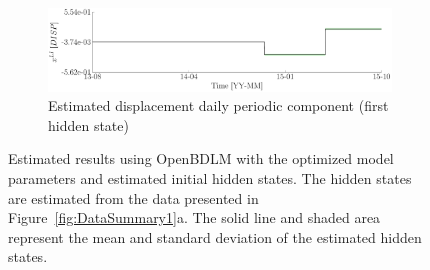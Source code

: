 \begin{figure}[h!]
\begin{center}
\begin{subfigure}{\linewidth}
\centering
\includegraphics[width=0.9\linewidth]{./docfigs/Example_DISP_INTERVENTION/DISP_LI_7.pdf}
\caption{Estimated displacement daily periodic component (first hidden state)}
\end{subfigure}
\caption{Estimated results using OpenBDLM with the optimized model parameters and estimated initial hidden states. The hidden states are estimated from the data presented in Figure~\ref{fig:DataSummary1}a. The solid line and shaded area represent the mean and standard deviation of the estimated hidden states.}
\label{fig:Example_DISP_INTERVENTIONOptimizedOptimizedExample1}
\end{center}
\end{figure}



